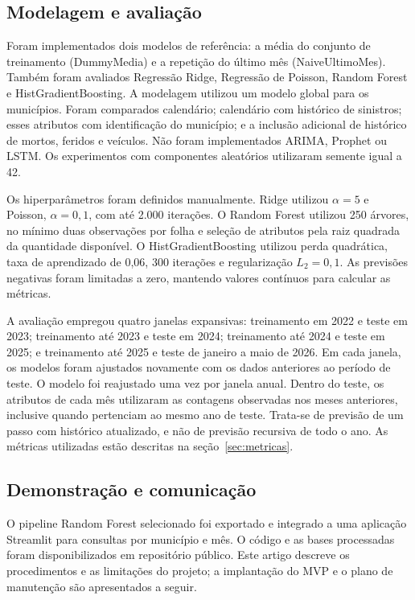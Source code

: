 \documentclass[12pt]{article}
\begin{document}
\subsection{Modelagem e avaliação}

Foram implementados dois modelos de referência: a média do conjunto de treinamento (DummyMedia) e a repetição do último mês (NaiveUltimoMes). Também foram avaliados Regressão Ridge, Regressão de Poisson, Random Forest e HistGradientBoosting. A modelagem utilizou um modelo global para os municípios. Foram comparados calendário; calendário com histórico de sinistros; esses atributos com identificação do município; e a inclusão adicional de histórico de mortos, feridos e veículos. Não foram implementados ARIMA, Prophet ou LSTM. Os experimentos com componentes aleatórios utilizaram semente igual a 42.

Os hiperparâmetros foram definidos manualmente. Ridge utilizou $\alpha=5$ e Poisson, $\alpha=0{,}1$, com até 2.000 iterações. O Random Forest utilizou 250 árvores, no mínimo duas observações por folha e seleção de atributos pela raiz quadrada da quantidade disponível. O HistGradientBoosting utilizou perda quadrática, taxa de aprendizado de 0,06, 300 iterações e regularização $L_2=0{,}1$. As previsões negativas foram limitadas a zero, mantendo valores contínuos para calcular as métricas.

A avaliação empregou quatro janelas expansivas: treinamento em 2022 e teste em 2023; treinamento até 2023 e teste em 2024; treinamento até 2024 e teste em 2025; e treinamento até 2025 e teste de janeiro a maio de 2026. Em cada janela, os modelos foram ajustados novamente com os dados anteriores ao período de teste. O modelo foi reajustado uma vez por janela anual. Dentro do teste, os atributos de cada mês utilizaram as contagens observadas nos meses anteriores, inclusive quando pertenciam ao mesmo ano de teste. Trata-se de previsão de um passo com histórico atualizado, e não de previsão recursiva de todo o ano. As métricas utilizadas estão descritas na seção~\ref{sec:metricas}.

\subsection{Demonstração e comunicação}

O pipeline Random Forest selecionado foi exportado e integrado a uma aplicação Streamlit para consultas por município e mês. O código e as bases processadas foram disponibilizados em repositório público. Este artigo descreve os procedimentos e as limitações do projeto; a implantação do MVP e o plano de manutenção são apresentados a seguir.
\end{document}
